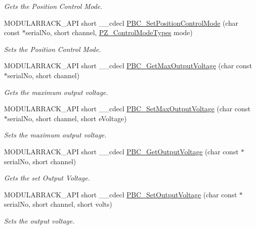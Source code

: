 \begin{DoxyCompactItemize}
\begin{DoxyCompactList}\small\item\em Gets the Position Control Mode. \end{DoxyCompactList}\item 
M\+O\+D\+U\+L\+A\+R\+R\+A\+C\+K\+\_\+\+A\+PI short \+\_\+\+\_\+cdecl \hyperlink{group___modular_piezo_ga0707223059e6323419c8abdab5e18554}{P\+B\+C\+\_\+\+Set\+Position\+Control\+Mode} (char const $\ast$serial\+No, short channel, \hyperlink{group___common_gaa4ff718266308759b2633c56c9a813b1}{P\+Z\+\_\+\+Control\+Mode\+Types} mode)
\begin{DoxyCompactList}\small\item\em Sets the Position Control Mode. \end{DoxyCompactList}\item 
M\+O\+D\+U\+L\+A\+R\+R\+A\+C\+K\+\_\+\+A\+PI short \+\_\+\+\_\+cdecl \hyperlink{group___modular_piezo_ga2fd0a7b9aa83e74a9f50ad5a4dac3fde}{P\+B\+C\+\_\+\+Get\+Max\+Output\+Voltage} (char const $\ast$serial\+No, short channel)
\begin{DoxyCompactList}\small\item\em Gets the maximum output voltage. \end{DoxyCompactList}\item 
M\+O\+D\+U\+L\+A\+R\+R\+A\+C\+K\+\_\+\+A\+PI short \+\_\+\+\_\+cdecl \hyperlink{group___modular_piezo_ga2761167d7343ff9944fd1c0af3ad483d}{P\+B\+C\+\_\+\+Set\+Max\+Output\+Voltage} (char const $\ast$serial\+No, short channel, short e\+Voltage)
\begin{DoxyCompactList}\small\item\em Sets the maximum output voltage. \end{DoxyCompactList}\item 
M\+O\+D\+U\+L\+A\+R\+R\+A\+C\+K\+\_\+\+A\+PI short \+\_\+\+\_\+cdecl \hyperlink{group___modular_piezo_gaa123f53a1f7ee6d762286c44f5ed53d3}{P\+B\+C\+\_\+\+Get\+Output\+Voltage} (char const $\ast$serial\+No, short channel)
\begin{DoxyCompactList}\small\item\em Gets the set Output Voltage. \end{DoxyCompactList}\item 
M\+O\+D\+U\+L\+A\+R\+R\+A\+C\+K\+\_\+\+A\+PI short \+\_\+\+\_\+cdecl \hyperlink{group___modular_piezo_ga3a97f0ea2b1fa717e66b4cb1f974bc32}{P\+B\+C\+\_\+\+Set\+Output\+Voltage} (char const $\ast$serial\+No, short channel, short volts)
\begin{DoxyCompactList}\small\item\em Sets the output voltage. \end{DoxyCompactList}\item 

\end{DoxyCompactItemize}
